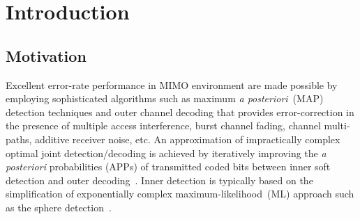\chapter{Introduction}
\label{ch:Introduction} 


\section{Motivation}
\label{sec:Motivation} Excellent error-rate performance in MIMO
environment are made possible by employing sophisticated algorithms
such as maximum \emph{a posteriori}~(MAP) detection techniques and
outer channel decoding that provides error-correction in the presence
of multiple access interference, burst channel fading, channel
multi-paths, additive receiver noise, etc. An approximation of
impractically complex optimal joint detection/decoding is achieved by
iteratively improving the \emph{a posteriori} probabilities (APPs) of
transmitted coded bits between inner soft detection and outer
decoding~\cite{almlof1991elimination}. Inner detection is typically
based on the simplification of exponentially complex
maximum-likelihood~(ML) approach such as the sphere
detection~\cite{purvis1982full}.
 